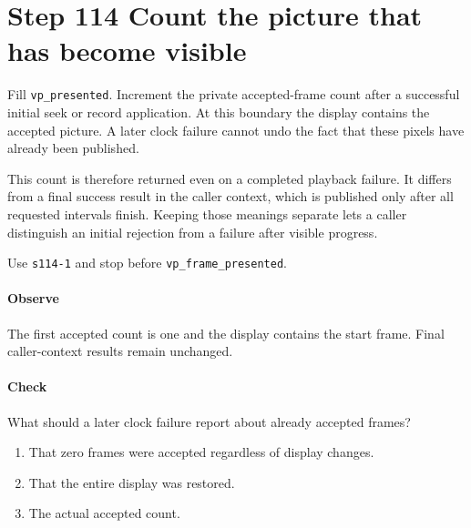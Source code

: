 \section{Step 114 Count the picture that has become visible}
Fill \texttt{vp\_presented}. Increment the private accepted-frame count after a successful initial seek or record application. At this boundary the display contains the accepted picture. A later clock failure cannot undo the fact that these pixels have already been published.

This count is therefore returned even on a completed playback failure. It differs from a final success result in the caller context, which is published only after all requested intervals finish. Keeping those meanings separate lets a caller distinguish an initial rejection from a failure after visible progress.

Use \texttt{s114-1} and stop before \texttt{vp\_frame\_presented}.

\paragraph{Observe} The first accepted count is one and the display contains the start frame. Final caller-context results remain unchanged.

\paragraph{Check} What should a later clock failure report about already accepted frames?
\begin{enumerate}[label=\Alph*.]
  \item That zero frames were accepted regardless of display changes.
  \item That the entire display was restored.
  \item The actual accepted count.
\end{enumerate}
